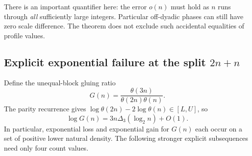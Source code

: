 \documentclass[11pt,a4paper]{article}
\numberwithin{equation}{section}
\theoremstyle{definition}
\theoremstyle{remark}
\theoremstyle{definition}
\theoremstyle{plain}
\begin{document}
There is an important quantifier here: the error $o(n)$ must hold as $n$
runs through \emph{all} sufficiently large integers. Particular off-dyadic
phases can still have zero scale difference. The theorem does not exclude
such accidental equalities of profile values.

\subsection{Explicit exponential failure at the split \texorpdfstring{$2n+n$}{2n+n}}
Define the unequal-block gluing ratio
\begin{equation}
 G(n)=\frac{\theta(3n)}{\theta(2n)\theta(n)}.
\end{equation}
The parity recurrence gives
$\log\theta(2n)-2\log\theta(n)\in[L,U]$, so
\begin{equation}
 \log G(n)=3n\Delta_3(\log_2n)+O(1).
\label{dsr:eq:Gphase}
\end{equation}
In particular, exponential loss and exponential gain for $G(n)$ each occur
on a set of positive lower natural density. The following stronger explicit
subsequences need only four count values.
\end{document}
